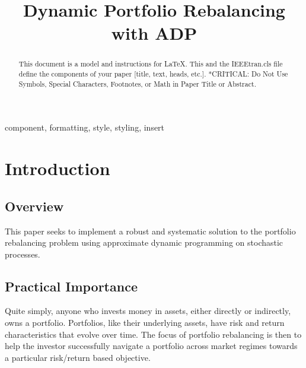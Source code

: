 \documentclass[conference]{IEEEtran}
\begin{document}
\title{Dynamic Portfolio Rebalancing with ADP}


\author{
\and
{}
}


\maketitle

\begin{abstract}
This document is a model and instructions for \LaTeX.
This and the IEEEtran.cls file define the components of your paper [title, text, heads, etc.]. *CRITICAL: Do Not Use Symbols, Special Characters, Footnotes, 
or Math in Paper Title or Abstract.
\end{abstract}

\begin{IEEEkeywords}
component, formatting, style, styling, insert
\end{IEEEkeywords}

\section{Introduction}

\subsection{Overview}

This paper seeks to implement a robust and systematic solution to the portfolio rebalancing problem using approximate dynamic programming on stochastic processes. 

\subsection{Practical Importance}

Quite simply, anyone who invests money in assets, either directly or indirectly, owns a portfolio. Portfolios, like their underlying assets, have risk and return characteristics that evolve over time. The focus of portfolio rebalancing is then to help the investor successfully navigate a portfolio across market regimes towards a particular risk/return based objective. 
\end{document}

